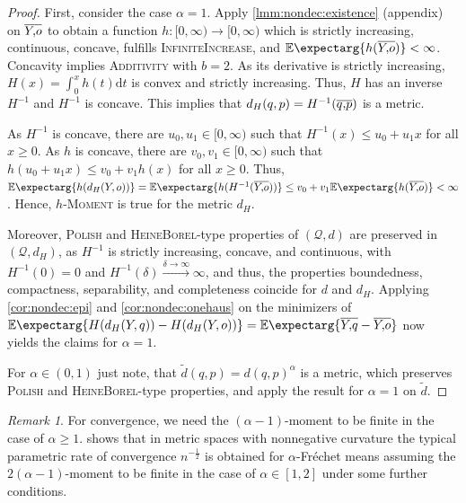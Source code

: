 \documentclass{scrartcl}
\newcommand{\Ex}{\E\expectarg}
\newcommand*{\mc}[1]{\mathcal{#1}}
\newcommand{\dl}{\mathrm{d}}
\theoremstyle{plain}\newtheorem{theorem}{Theorem}[section]
\theoremstyle{definition}
\theoremstyle{remark}
\newtheorem{remark}[theorem]{Remark}
\begin{document}
\begin{proof}
First, consider the case $\alpha=1$.
Apply \autoref{lmm:nondec:existence} (appendix) on $\overline{Y,\!o}$ to obtain a function $h \colon [0,\infty) \to [0,\infty)$ which is strictly increasing, continuous, concave, fulfills \textsc{InfiniteIncrease}, and $\Ex{h(\ol Yo)} < \infty$. Concavity implies \textsc{Additivity} with $b=2$.
As its derivative is strictly increasing, $H(x) = \int_0^x h(t) \dl t$ is convex and strictly increasing. Thus, $H$ has an inverse $H^{-1}$ and $H^{-1}$ is concave. 
This implies that $d_H(q,p) = H^{-1}(\overline{q,\!p})$ is a metric. 

As $H^{-1}$ is concave, there are $u_0, u_1 \in[0,\infty)$ such that $H^{-1}(x) \leq u_0 + u_1 x$ for all $x\geq0$.
As $h$ is concave, there are $v_0, v_1\in[0,\infty)$ such that $h(u_0 + u_1 x) \leq v_0 + v_1 h(x)$ for all $x\geq 0$.
Thus, $\Ex{h(d_H(Y, o))} = \Ex{h(H^{-1} (\ol Yo))} \leq v_0 + v_1 \Ex{h(\ol Yo)} < \infty$.
Hence, \textsc{$h$-Moment} is true for the metric $d_H$.

Moreover, \textsc{Polish} and \textsc{HeineBorel}-type properties of $(\mc Q, d)$ are preserved in $(\mc Q, d_H)$, as $H^{-1}$ is strictly increasing, concave, and continuous, with $H^{-1}(0) = 0$ and $H^{-1}(\delta)\xrightarrow{\delta\to\infty}\infty$, and thus, the properties boundedness, compactness, separability, and completeness coincide for $d$ and $d_H$.
Applying \autoref{cor:nondec:epi} and \autoref{cor:nondec:onehaus} on the minimizers of $\Ex{H(d_H(Y, q)) - H(d_H(Y, o))}  = \Ex{\ol  Yq - \ol Yo}$ now yields the claims for $\alpha=1$.

For $\alpha \in (0,1)$ just note, that $\tilde d(q,p) = d(q,p)^\alpha$ is a metric, which preserves \textsc{Polish} and \textsc{HeineBorel}-type properties, and apply the result for $\alpha = 1$ on $\tilde d$.
\end{proof}
\begin{remark}
	 For convergence, we need the $(\alpha-1)$-moment to be finite in the case of $\alpha \geq 1$. \cite[Corollary 5]{schoetz19} shows that in metric spaces with nonnegative curvature the typical parametric rate of convergence $n^{-\frac12}$ is obtained for $\alpha$-Fréchet means assuming the $2(\alpha-1)$-moment to be finite in the case of $\alpha\in[1,2]$ under some further conditions.
\end{remark}
\end{document}
